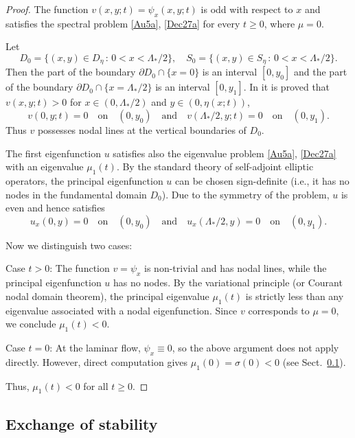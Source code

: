 \documentclass[oneside,a4paper,11pt]{article}
\theoremstyle{thmstyletwo}%
\theoremstyle{thmstylethree}%
\numberwithin{equation}{section}
\begin{document}
\begin{proof}
The function $v(x,y;t)=\psi_x(x,y;t)$ is odd with respect to $x$ and satisfies the spectral problem \eqref{Au5a}, \eqref{Dec27a} for every $t\geq 0$, where $\mu=0$.

Let
$$
D_0=\{(x,y)\in D_\eta\,:\, 0<x<\Lambda_*/2\},\quad S_0=\{(x,y)\in S_\eta\,:\, 0<x<\Lambda_*/2\}.
$$
Then the part of the boundary $\partial D_0\cap \{x=0\}$ is an interval $[0,y_0]$ and the part of the boundary
$\partial D_0\cap \{x=\Lambda_*/2\}$ is an interval $[0,y_1]$.
In \cite{Koz2} it is proved that
$v(x,y;t)>0$ for $x\in (0,\Lambda_*/2)$ and $y\in (0,\eta(x;t))$,
\begin{equation*}
v(0,y;t)=0\quad\mbox{on}\quad (0,y_0)\quad \mbox{and}\quad v(\Lambda_*/2,y;t)=0\quad\mbox{on}\quad (0,y_1).
\end{equation*}
Thus $v$ possesses nodal lines at the vertical boundaries of $D_0$.

The first eigenfunction $u$ satisfies also the eigenvalue problem \eqref{Au5a}, \eqref{Dec27a} with an eigenvalue $\mu_1(t)$. 
By the standard theory of self-adjoint elliptic operators, the principal eigenfunction $u$ can be chosen sign-definite 
(i.e., it has no nodes in the fundamental domain $D_0$). Due to the symmetry of the problem, $u$ is even and hence satisfies
\begin{equation*}
u_x(0,y)=0\quad\mbox{on}\quad (0,y_0)\quad \mbox{and}\quad u_x(\Lambda_*/2,y)=0\quad\mbox{on}\quad (0,y_1).
\end{equation*}

Now we distinguish two cases:

Case $t > 0$: The function $v = \psi_x$ is non-trivial and has nodal lines, while the principal eigenfunction $u$ has no nodes. 
By the variational principle (or Courant nodal domain theorem), the principal eigenvalue $\mu_1(t)$ is strictly less than any 
eigenvalue associated with a nodal eigenfunction. Since $v$ corresponds to $\mu = 0$, we conclude $\mu_1(t) < 0$.

Case $t = 0$: At the laminar flow, $\psi_x \equiv 0$, so the above argument does not apply directly. 
However, direct computation gives $\mu_1(0) = \sigma(0) < 0$ (see Sect.~\ref{SectJ22a}).

Thus, $\mu_1(t) < 0$ for all $t \ge 0$.
\end{proof}

\subsection{Exchange of stability}\label{SectJ22a}
\end{document}
